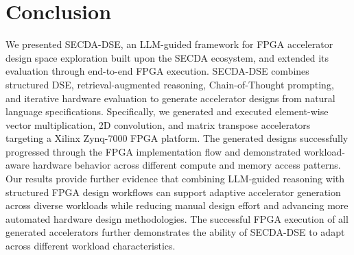 
\section{Conclusion}
\label{Conclusion}

We presented SECDA-DSE, an LLM-guided framework for FPGA accelerator design space exploration built upon the SECDA ecosystem, and extended its evaluation through end-to-end FPGA execution. SECDA-DSE combines structured DSE, retrieval-augmented reasoning, Chain-of-Thought prompting, and iterative hardware evaluation to generate accelerator designs from natural language specifications. 
Specifically, we generated and executed element-wise vector multiplication, 2D convolution, and matrix transpose accelerators targeting a Xilinx Zynq-7000 FPGA platform. The generated designs successfully progressed through the FPGA implementation flow and demonstrated workload-aware hardware behavior across different compute and memory access patterns. 
Our results provide further evidence that combining LLM-guided reasoning with structured FPGA design workflows can support adaptive accelerator generation across diverse workloads while reducing manual design effort and advancing more automated hardware design methodologies. The successful FPGA execution of all generated accelerators further demonstrates the ability of SECDA-DSE to adapt across different workload characteristics.
